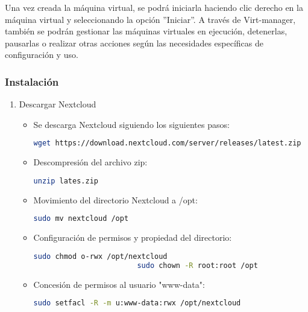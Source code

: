 			Una vez creada la máquina virtual, se podrá iniciarla haciendo clic derecho en la máquina virtual y seleccionando la opción ''Iniciar''. A través de Virt-manager, también se podrán gestionar las máquinas virtuales en ejecución, detenerlas, pausarlas o realizar otras acciones según las necesidades específicas de configuración y uso.

	
			\subsubsection{Instalación}
			
			\begin{enumerate}
				
				\item Descargar Nextcloud
				
				\begin{itemize}
					
					\item Se descarga Nextcloud siguiendo los siguientes pasos:
		
						\begin{lstlisting}[language=Bash,caption=NextCloud]
						wget https://download.nextcloud.com/server/releases/latest.zip
						\end{lstlisting}
					\item Descompresión del archivo zip:	
						\begin{lstlisting}[language=Bash,caption=Descomprimir]
						unzip lates.zip
						\end{lstlisting}
					\item Movimiento del directorio Nextcloud a /opt:	
						\begin{lstlisting}[language=Bash,caption=Mover contenido]
						sudo mv nextcloud /opt
						\end{lstlisting}
					\item Configuración de permisos y propiedad del directorio:
						\begin{lstlisting}[language=Bash,caption=Dueño]
						sudo chmod o-rwx /opt/nextcloud
						sudo chown -R root:root /opt
						\end{lstlisting}
					\item Concesión de permisos al usuario "www-data":					
						\begin{lstlisting}[language=Bash,caption=Permiso]
						sudo setfacl -R -m u:www-data:rwx /opt/nextcloud
						\end{lstlisting}
							
				\end{itemize}
				

\end{enumerate}
